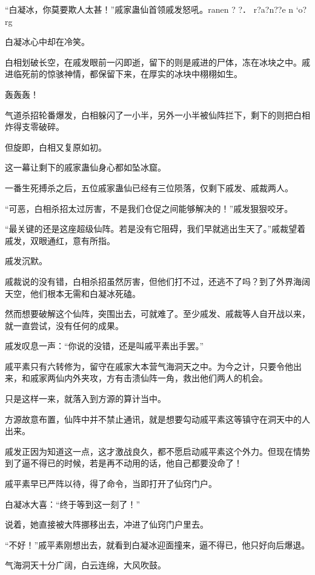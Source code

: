
\begin{this_body}

“白凝冰，你莫要欺人太甚！”戚家蛊仙首领戚发怒吼。ranen ? ?． r?a?n??e n `o?rg

白凝冰心中却在冷笑。

白相划破长空，在戚发眼前一闪即逝，留下的则是戚进的尸体，冻在冰块之中。戚进临死前的惊骇神情，都保留下来，在厚实的冰块中栩栩如生。

轰轰轰！

气道杀招轮番爆发，白相躲闪了一小半，另外一小半被仙阵拦下，剩下的则把白相炸得支零破碎。

但旋即，白相又复原如初。

这一幕让剩下的戚家蛊仙身心都如坠冰窟。

一番生死搏杀之后，五位戚家蛊仙已经有三位陨落，仅剩下戚发、戚裁两人。

“可恶，白相杀招太过厉害，不是我们仓促之间能够解决的！”戚发狠狠咬牙。

“最关键的还是这座超级仙阵。若是没有它阻碍，我们早就逃出生天了。”戚裁望着戚发，双眼通红，意有所指。

戚发沉默。

戚裁说的没有错，白相杀招虽然厉害，但他们打不过，还逃不了吗？到了外界海阔天空，他们根本无需和白凝冰死磕。

然而想要破解这个仙阵，突围出去，可就难了。至少戚发、戚裁等人自开战以来，就一直尝试，没有任何的成果。

戚发叹息一声：“你说的没错，还是叫戚平素出手罢。”

戚平素只有六转修为，留守在戚家大本营气海洞天之中。为今之计，只要令他出来，和戚家两仙内外夹攻，方有击溃仙阵一角，救出他们两人的机会。

只是这样一来，就落入到方源的算计当中。

方源故意布置，仙阵中并不禁止通讯，就是想要勾动戚平素这等镇守在洞天中的人出来。

戚发正因为知道这一点，这才激战良久，都不愿启动戚平素这个外力。但现在情势到了逼不得已的时候，若是再不动用的话，他自己都要没命了！

戚平素早已严阵以待，得了命令，当即打开了仙窍门户。

白凝冰大喜：“终于等到这一刻了！”

说着，她直接被大阵挪移出去，冲进了仙窍门户里去。

“不好！”戚平素刚想出去，就看到白凝冰迎面撞来，逼不得已，他只好向后爆退。

气海洞天十分广阔，白云连绵，大风吹鼓。


\end{this_body}
